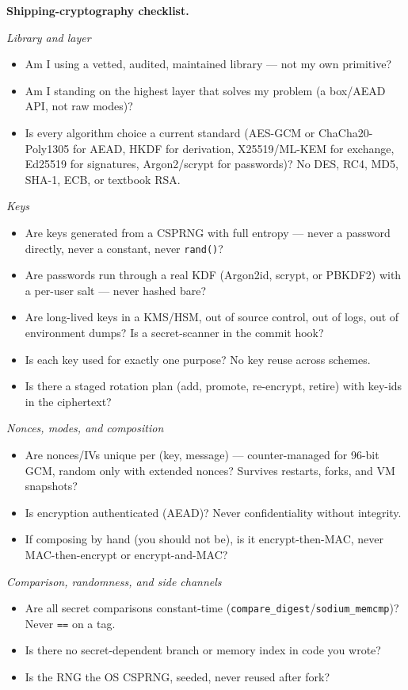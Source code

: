 \begin{focusbox}
\textbf{Shipping-cryptography checklist.}

\emph{Library and layer}
\begin{itemize}
  \item Am I using a vetted, audited, maintained library --- not my own primitive?
  \item Am I standing on the highest layer that solves my problem (a box/AEAD API,
  not raw modes)?
  \item Is every algorithm choice a current standard (AES-GCM or ChaCha20-Poly1305
  for AEAD, HKDF for derivation, X25519/ML-KEM for exchange, Ed25519 for
  signatures, Argon2/scrypt for passwords)? No DES, RC4, MD5, SHA-1, ECB, or
  textbook RSA.
\end{itemize}

\emph{Keys}
\begin{itemize}
  \item Are keys generated from a CSPRNG with full entropy --- never a password
  directly, never a constant, never \texttt{rand()}?
  \item Are passwords run through a real KDF (Argon2id, scrypt, or PBKDF2) with a
  per-user salt --- never hashed bare?
  \item Are long-lived keys in a KMS/HSM, out of source control, out of logs, out of
  environment dumps? Is a secret-scanner in the commit hook?
  \item Is each key used for exactly one purpose? No key reuse across schemes.
  \item Is there a staged rotation plan (add, promote, re-encrypt, retire) with
  key-ids in the ciphertext?
\end{itemize}

\emph{Nonces, modes, and composition}
\begin{itemize}
  \item Are nonces/IVs unique per (key, message) --- counter-managed for 96-bit
  GCM, random only with extended nonces? Survives restarts, forks, and VM
  snapshots?
  \item Is encryption authenticated (AEAD)? Never confidentiality without
  integrity.
  \item If composing by hand (you should not be), is it encrypt-then-MAC, never
  MAC-then-encrypt or encrypt-and-MAC?
\end{itemize}

\emph{Comparison, randomness, and side channels}
\begin{itemize}
  \item Are all secret comparisons constant-time
  (\texttt{compare\_digest}/\texttt{sodium\_memcmp})? Never \texttt{==} on a tag.
  \item Is there no secret-dependent branch or memory index in code you wrote?
  \item Is the RNG the OS CSPRNG, seeded, never reused after fork?
\end{itemize}


\end{focusbox}

